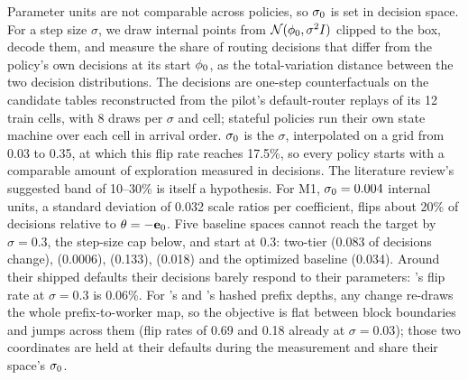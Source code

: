 Parameter units are not comparable across policies, so $\sigma_{0}$ is set in decision space.
For a step size $\sigma$, we draw internal points from $\mathcal{N}(\phi_0, \sigma^2 I)$
clipped to the box, decode them, and measure the share of routing decisions that differ from the
policy's own decisions at its start $\phi_0$, as the total-variation distance between the
two decision distributions. The decisions are one-step counterfactuals on the candidate tables
reconstructed from the pilot's default-router replays of its 12 train cells, with 8 draws per
$\sigma$ and cell; stateful policies run their own state machine over each cell in arrival order.
$\sigma_{0}$ is the $\sigma$, interpolated on a grid from 0.03 to 0.35, at which this flip rate
reaches 17.5\%, so every policy starts with a comparable amount of exploration measured in
decisions. The literature review's suggested band of 10--30\% is itself a hypothesis.
For M1, $\sigma_{0} = 0.004$ internal units, a standard deviation of 0.032 scale ratios per
coefficient, flips about 20\% of decisions relative to $\theta = -\mathbf{e}_{0}$.
Five baseline spaces cannot reach the target by $\sigma = 0.3$, the step-size cap below, and start
at 0.3: two-tier (0.083 of decisions change),  (0.0006),  (0.133),
 (0.018) and the optimized baseline (0.034). Around their shipped defaults their
decisions barely respond to their parameters: 's flip rate at $\sigma = 0.3$ is
0.06\%. For 's and 's hashed prefix depths, any change re-draws the
whole prefix-to-worker map, so the objective is flat between block boundaries and jumps across
them (flip rates of 0.69 and 0.18 already at $\sigma = 0.03$); those two coordinates are held at
their defaults during the measurement and share their space's $\sigma_{0}$.

